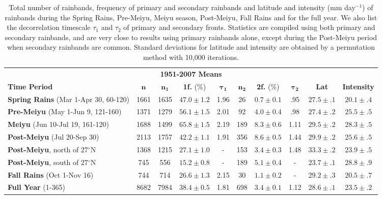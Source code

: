 \documentclass[draft,grl]{agutexSI}
\begin{document}
\begin{table}

\caption{Total number of rainbands, frequency of primary and secondary rainbands and latitude and intensity (mm day$^{-1}$) of rainbands during the Spring Rains, Pre-Meiyu, Meiyu season, Post-Meiyu, Fall Rains and for the full year. We also list the decorrelation timescale $\tau_1$  and $\tau_2$ of primary and secondary fronts. Statistics are compiled using both primary and secondary rainbands, and are very close to results using primary rainbands alone, except during the Post-Meiyu period when secondary rainbands are common. Standard deviations for latitude and intensity are obtained by a permutation method with 10,000 iterations.}

\begin{tabular}{ l c c c c c c c c c}
	 \multicolumn{10}{c}{\textbf{1951-2007 Means}} \\
	 \textbf{Time Period} & $\boldsymbol{n}$ & $\boldsymbol{n_1}$ & \textbf{1f.} (\%) & $\boldsymbol{\tau_1}$ & $\boldsymbol{n_2}$ & \textbf{2f.} (\%) & $\boldsymbol{\tau_2}$ & \textbf{Lat} & \textbf{Intensity} \\
	 \hline
	\textbf{Spring Rains} (Mar 1-Apr 30, 60-120) & 1661 & 1635 	& $47.0 \pm 1.2$ 	& 1.96	& 26 	&$0.7 \pm 0.1$ 	& .95 	& $27.5 \pm .1$ & $20.1 \pm .4$ \\
	\textbf{Pre-Meiyu} (May 1-Jun 9, 121-160) & 1371 & 1279  	& $56.1 \pm 1.5$ 	& 2.01	& 92 	&$4.0 \pm 0.4$	& .98 	& $27.4 \pm .2$ & $25.5 \pm .5$ \\
	\textbf{Meiyu} (Jun 10-Jul 19, 161-120) & 1688 & 1499 		& $65.8 \pm 1.5$ 	& 2.19	& 189 	&$8.3 \pm 0.6$ 	& 1.11	& $29.5 \pm .2$ & $28.3 \pm .5$ \\
	\textbf{Post-Meiyu} (Jul 20-Sep 30) & 2113 & 1757 			& $42.2 \pm 1.1 $	& 1.91 	& 356 	&$8.6 \pm 0.5$ 	& 1.44	& $29.9 \pm .2$ & $25.6 \pm .5$ \\
	\textbf{Post-Meiyu}, north of 27$^\circ$N & 1368 & 1215 	& $27.1 \pm 1.0 $ 	& -		& 153 	&$3.4 \pm 0.3$ 	& 1.48	& $33.3 \pm .2$ & $23.9 \pm .5$ \\
	\textbf{Post-Meiyu}, south of 27$^\circ$N & 745 & 556 		& $15.2 \pm 0.8 $ 	& -		& 189 	&$5.1 \pm 0.4$ 	& -		& $23.7 \pm .1$ & $28.8 \pm .9$ \\
	\textbf{Fall Rains} (Oct 1-Nov 16) & 744 & 714 				& $26.6 \pm 1.3 $ 	& 2.15	& 30 	&$1.1 \pm 0.2$	& - 		& $29.2 \pm .3$ & $20.5 \pm .7$ \\
	\textbf{Full Year} (1-365) & 8682 & 7984 					& $38.4 \pm 0.5$ 	& 1.81 	& 698 	&$3.4 \pm 0.1$ 	& 1.12	& $28.6 \pm .1$ & $23.5 \pm .2$ \\
\end{tabular}
\label{ts4}
\end{table}
\end{document}
